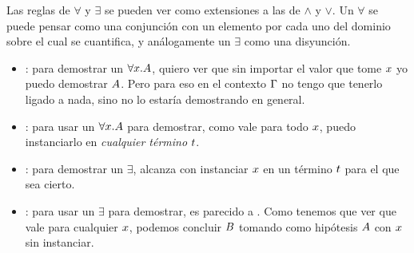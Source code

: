 Las reglas de $\forall$ y $\exists$ se pueden ver como extensiones a las de
$\wedge$ y $\vee$. Un $\forall$ se puede pensar como una conjunción con un
elemento por cada uno del dominio sobre el cual se cuantifica, y análogamente un $\exists$ como una disyunción.

\begin{multicols}{2}
    \proofTreeForallI
    \proofTreeForallE
\end{multicols}

\begin{itemize}
    \item {}: para demostrar un $\forall x. A$, quiero ver que sin importar el valor que tome $x$ yo puedo demostrar $A$. Pero para eso en el contexto $\Gamma$ no tengo que tenerlo ligado a nada, sino no lo estaría demostrando en general.
    \item {}: para usar un $\forall x.A$ para demostrar, como
    vale para todo $x$, puedo instanciarlo en \textit{cualquier término} $t$.
\end{itemize}

\proofTreeExistsI
\proofTreeExistsE

\begin{itemize}
    \item {}: para demostrar un $\exists$, alcanza con instanciar $x$ en un término $t$ para el que sea cierto.
    \item {}: para usar un $\exists$ para demostrar, es parecido a . Como tenemos que ver que vale para cualquier $x$, podemos concluir $B$ tomando como hipótesis $A$ con $x$ sin instanciar. 
\end{itemize}

